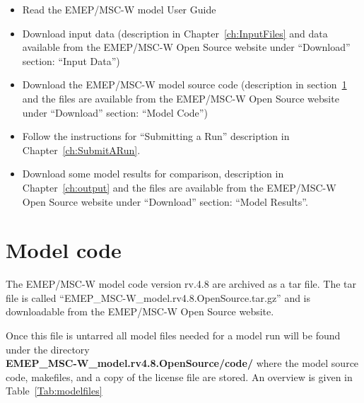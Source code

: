 \begin{itemize}
\item Read the EMEP/MSC-W model User Guide
\item
Download input data (description in Chapter~\ref{ch:InputFiles} and
data available from the EMEP/MSC-W Open Source website under ``Download''
section: ``Input Data'')
\item
Download the EMEP/MSC-W model source code (description in 
section~\ref{sec:ModelCode} and the files are available from the EMEP/MSC-W 
Open Source website under ``Download'' section: ``Model Code'')
\item
Follow the instructions for ``Submitting a Run'' description in
Chapter~\ref{ch:SubmitARun}.
\item
Download some model results for comparison, description in
Chapter~\ref{ch:output} and the files are available from the EMEP/MSC-W 
Open Source website under ``Download'' section: ``Model Results''. 


\end{itemize}

\section{Model code}
\label{sec:ModelCode}

The EMEP/MSC-W model code version rv.4.8 are archived as a tar file. 
The tar file is called ``EMEP\_MSC-W\_model.rv4.8.OpenSource.tar.gz'' and 
is downloadable from the EMEP/MSC-W Open Source website.

Once this file is untarred all model files needed for a model run will be 
found under the directory \\ {\bf EMEP\_MSC-W\_model.rv4.8.OpenSource/code/} 
where the model source code, makefiles, and a copy of the license file are 
stored. An overview is given in Table~\ref{Tab:modelfiles}

